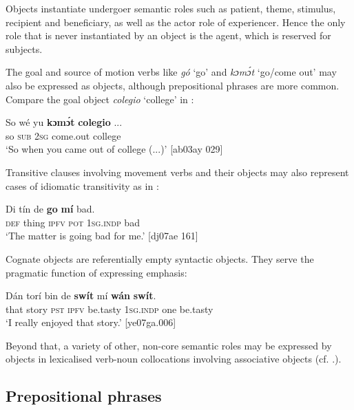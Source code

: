 Objects instantiate undergoer semantic roles such as patient, theme, stimulus, recipient and beneficiary, as well as the actor role of experiencer. Hence the only role that is never instantiated by an object is the agent, which is reserved for subjects. 


The goal\is{} and source of motion verbs like \textit{gó} ‘go’ and \textit{kɔmɔ́t} ‘go/come out’ may also be expressed as objects, although prepositional phrases are more common. Compare the goal object \textit{colegio} ‘college’ in :



\ea%
    \label{ex:key:1048}
    \gll So  wé  yu  \textbf{kɔmɔ́t}    \textbf{colegio}  \op...\cp{}\\
so  \textsc{sub}  \textsc{2sg}  come.out  college\\

\glt ‘So when you came out of college (...)’ [ab03ay 029]
\z

Transitive clauses involving movement verbs and their objects may also represent cases of idiomatic transitivity as in : 


\ea%
    \label{ex:key:1049}
    \gll Di  tín    de  \textbf{go}  \textbf{mí}    bad.\\
\textsc{def}  thing  \textsc{ipfv}  \textsc{pot}  \textsc{1sg.indp}  bad\\

\glt ‘The matter is going bad for me.’ [dj07ae 161]
\z

Cognate objects are referentially empty syntactic objects. They serve the pragmatic function of expressing emphasis: 


\ea%
    \label{ex:key:1050}
    \gll Dán    torí    bin  de  \textbf{swít}    mí    \textbf{wán}    \textbf{swít}.\\
that    story  \textsc{pst}  \textsc{ipfv}  be.tasty  \textsc{1sg.indp}  one    be.tasty\\

\glt ‘I really enjoyed that story.’ [ye07ga.006]
\z

Beyond that, a variety of other, non-core semantic roles may be expressed by objects in lexicalised verb-noun collocations involving associative objects (cf. .). 

\subsection{Prepositional phrases}\label{sec:9.1.3}

